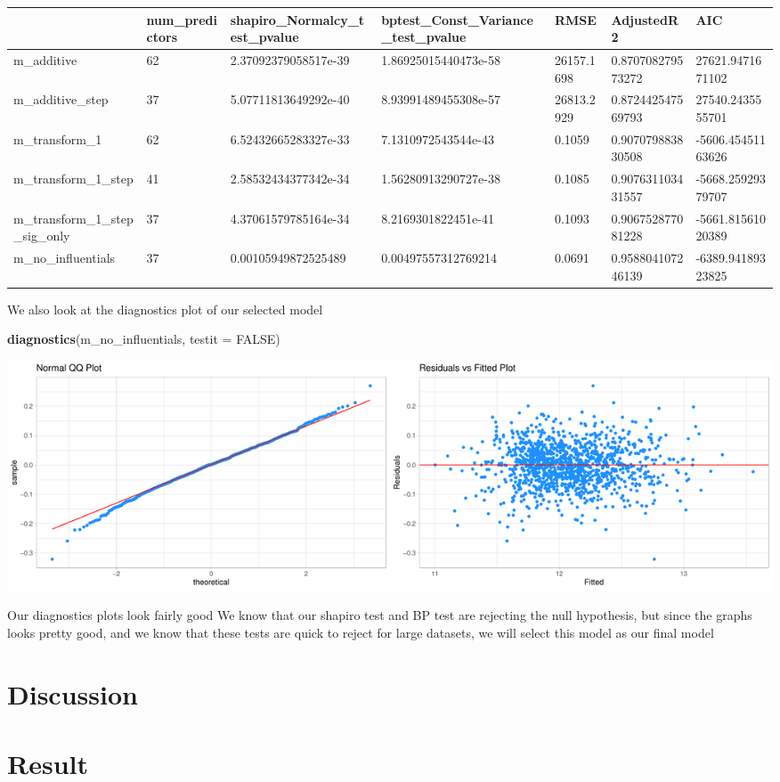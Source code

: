 \documentclass[
]{article}
\newenvironment{Shaded}{\begin{snugshade}}{\end{snugshade}}
\newcommand{\DataTypeTok}[1]{\textcolor[rgb]{0.13,0.29,0.53}{#1}}
\newcommand{\KeywordTok}[1]{\textcolor[rgb]{0.13,0.29,0.53}{\textbf{#1}}}
\newcommand{\NormalTok}[1]{#1}
\newcommand{\OtherTok}[1]{\textcolor[rgb]{0.56,0.35,0.01}{#1}}
\begin{document}
\begin{tabular}{l|l|l|l|l|l|l}
\hline
  & num\_predictors & shapiro\_Normalcy\_test\_pvalue & bptest\_Const\_Variance\_test\_pvalue & RMSE & AdjustedR2 & AIC\\
\hline
m\_additive & 62 & 2.37092379058517e-39 & 1.86925015440473e-58 & 26157.1698 & 0.870708279573272 & 27621.9471671102\\
\hline
m\_additive\_step & 37 & 5.07711813649292e-40 & 8.93991489455308e-57 & 26813.2929 & 0.872442547569793 & 27540.2435555701\\
\hline
m\_transform\_1 & 62 & 6.52432665283327e-33 & 7.1310972543544e-43 & 0.1059 & 0.907079883830508 & -5606.45451163626\\
\hline
m\_transform\_1\_step & 41 & 2.58532434377342e-34 & 1.56280913290727e-38 & 0.1085 & 0.907631103431557 & -5668.25929379707\\
\hline
m\_transform\_1\_step\_sig\_only & 37 & 4.37061579785164e-34 & 8.2169301822451e-41 & 0.1093 & 0.906752877081228 & -5661.81561020389\\
\hline
m\_no\_influentials & 37 & 0.00105949872525489 & 0.00497557312769214 & 0.0691 & 0.958804107246139 & -6389.94189323825\\
\hline
\end{tabular}

We also look at the diagnostics plot of our selected model

\begin{Shaded}
\begin{Highlighting}[]
\KeywordTok{diagnostics}\NormalTok{(m_no_influentials, }\DataTypeTok{testit =} \OtherTok{FALSE}\NormalTok{)}
\end{Highlighting}
\end{Shaded}

\includegraphics{Final-Project_files/figure-latex/unnamed-chunk-43-1.pdf}

Our diagnostics plots look fairly good We know that our shapiro test and BP test are rejecting the null hypothesis, but since the graphs looks pretty good, and we know that these tests are quick to reject for large datasets, we will select this model as our final model

\hypertarget{discussion}{%
\section{Discussion}\label{discussion}}

\hypertarget{result}{%
\section{Result}\label{result}}
\end{document}
